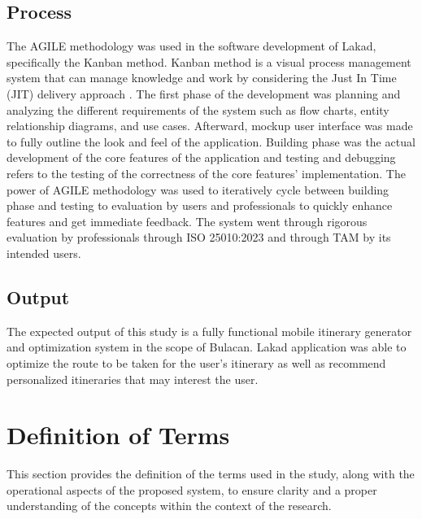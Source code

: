 \subsection{Process}
The AGILE methodology was used in the software development of Lakad, specifically the Kanban method. Kanban method is a visual process management system that can manage knowledge and work by considering the Just In Time (JIT) delivery approach \textcite{Alaidaros2021}. The first phase of the development was planning and analyzing the different requirements of the system such as flow charts, entity relationship diagrams, and use cases. Afterward, mockup user interface was made to fully outline the look and feel of the application. Building phase was the actual development of the core features of the application and testing and debugging refers to the testing of the correctness of the core features’ implementation. The power of AGILE methodology was used to iteratively cycle between building phase and testing to evaluation by users and professionals to quickly enhance features and get immediate feedback. The system went through rigorous evaluation by professionals through ISO 25010:2023 and through TAM by its intended users.

\subsection{Output}
The expected output of this study is a fully functional mobile itinerary generator and optimization system in the scope of Bulacan. Lakad application was able to optimize the route to be taken for the user’s itinerary as well as recommend personalized itineraries that may interest the user.

\section{Definition of Terms}
This section provides the definition of the terms used in the study, along with the operational aspects of the proposed system, to ensure clarity and a proper understanding of the concepts within the context of the research.

